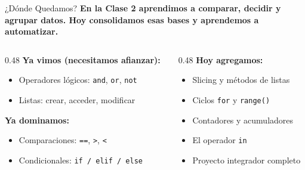 \documentclass[aspectratio=169, 11pt]{beamer}
\begin{document}
\begin{frame}{¿Dónde Quedamos?}
  \vspace{-6pt}
  {\small\color{arcaDark}\bfseries
    En la Clase 2 aprendimos a comparar, decidir y agrupar datos.
    Hoy consolidamos esas bases y aprendemos a \textbf{automatizar}.}

  \vspace{8pt}
  \begin{columns}[T]
    \begin{column}{0.48\textwidth}
      {\footnotesize\color{arcaDark}\bfseries Ya vimos (necesitamos afianzar):}
      \vspace{4pt}
      {\footnotesize
      \begin{itemize}\setlength{\itemsep}{4pt}
        \item[{\color{codeOrange}\scriptsize\faWrench}]
          Operadores lógicos: \texttt{and}, \texttt{or}, \texttt{not}
        \item[{\color{codeOrange}\scriptsize\faWrench}]
          Listas: crear, acceder, modificar
      \end{itemize}
      }
      \vspace{6pt}
      {\footnotesize\color{arcaDark}\bfseries Ya dominamos:}
      \vspace{4pt}
      {\footnotesize
      \begin{itemize}\setlength{\itemsep}{4pt}
        \item[{\color{codeGreen}\scriptsize\faCheck}]
          Comparaciones: \texttt{==}, \texttt{>}, \texttt{<}
        \item[{\color{codeGreen}\scriptsize\faCheck}]
          Condicionales: \texttt{if / elif / else}
      \end{itemize}
      }
    \end{column}

    \begin{column}{0.48\textwidth}
      {\footnotesize\color{arcaDark}\bfseries Hoy agregamos:}
      \vspace{4pt}
      {\footnotesize
      \begin{itemize}\setlength{\itemsep}{4pt}
        \item[{\color{arcaRed}\scriptsize\faArrowRight}]
          Slicing y métodos de listas
        \item[{\color{arcaRed}\scriptsize\faArrowRight}]
          Ciclos \texttt{for} y \texttt{range()}
        \item[{\color{arcaRed}\scriptsize\faArrowRight}]
          Contadores y acumuladores
        \item[{\color{arcaRed}\scriptsize\faArrowRight}]
          El operador \texttt{in}
        \item[{\color{arcaRed}\scriptsize\faArrowRight}]
          Proyecto integrador completo
      \end{itemize}
      }
    \end{column}
  \end{columns}


\end{frame}
\end{document}
